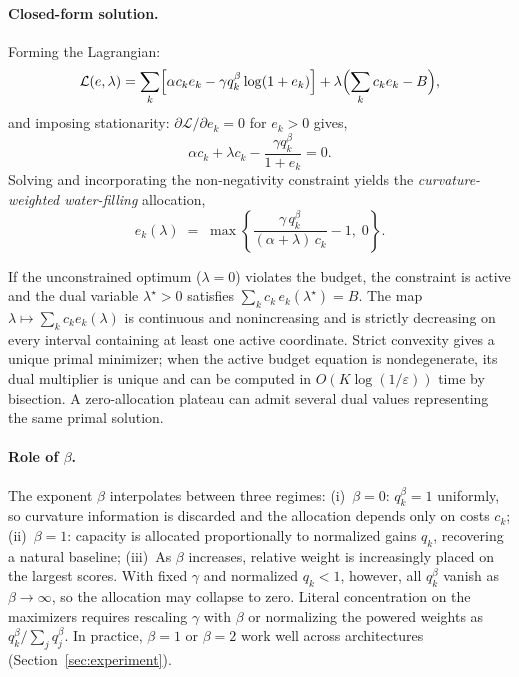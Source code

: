 \documentclass[accepted]{uai2026}%
\theoremstyle{remark}%
\begin{document}
\paragraph{Closed-form solution.}
Forming the Lagrangian:
\[
  \mathcal{L}(e,\lambda)
  =
  \sum_k
  \Bigl[\alpha c_k e_k - \gamma q_k^{\beta}\log(1+e_k)\Bigr]
  + \lambda\Bigl(\sum_k c_k e_k - B\Bigr),
\]
and imposing stationarity: $\partial\mathcal{L}/\partial e_k = 0$ for $e_k > 0$ gives,
\[
  \alpha c_k + \lambda c_k
  - \frac{\gamma q_k^{\beta}}{1 + e_k}
  = 0.
\]
Solving and incorporating the non-negativity constraint yields the
\emph{curvature-weighted water-filling} allocation,
\begin{equation}
  \label{eq:alloc_closed}
  \boxed{
    e_k(\lambda)
    \;=\;
    \max\!\left\{
      \frac{\gamma\, q_k^{\beta}}{(\alpha + \lambda)\,c_k}
      - 1,\;
      0
    \right\}.
  }
\end{equation}

If the unconstrained optimum ($\lambda = 0$) violates the budget,
the constraint is active and the dual variable $\lambda^{\star} > 0$
satisfies $\sum_k c_k\,e_k(\lambda^{\star}) = B$.
The map $\lambda\mapsto\sum_k c_k e_k(\lambda)$ is continuous
and nonincreasing and is strictly decreasing on every interval containing at
least one active coordinate. Strict convexity gives a unique primal minimizer;
when the active budget equation is nondegenerate, its dual multiplier is unique
and can be computed in $O(K\log(1/\varepsilon))$ time by bisection. A
zero-allocation plateau can admit several dual values representing the same
primal solution.

\paragraph{Role of $\beta$.}
The exponent $\beta$ interpolates between three regimes:
(i)~$\beta = 0$: $q_k^{\beta} = 1$ uniformly, so curvature information is
    discarded and the allocation depends only on costs $c_k$;
(ii)~$\beta = 1$: capacity is allocated proportionally to normalized gains
    $q_k$, recovering a natural baseline;
(iii)~As $\beta$ increases, relative weight is increasingly
placed on the largest scores. With fixed $\gamma$ and normalized $q_k<1$,
however, all $q_k^\beta$ vanish as $\beta\to\infty$, so the allocation may
collapse to zero. Literal concentration on the maximizers requires rescaling
$\gamma$ with $\beta$ or normalizing the powered weights as
$q_k^\beta/\sum_j q_j^\beta$.
In practice, $\beta = 1$ or $\beta = 2$ work well across architectures
(Section~\ref{sec:experiment}).
\end{document}
